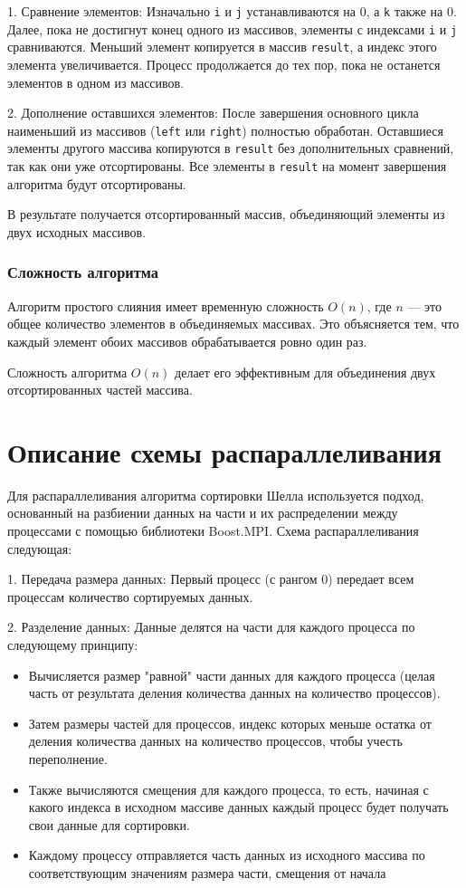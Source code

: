 \documentclass{report}
\begin{document}
1. Сравнение элементов: Изначально \texttt{i} и \texttt{j} устанавливаются на 0, а \texttt{k} также на 0. Далее, пока не достигнут конец одного из массивов, элементы с индексами \texttt{i} и \texttt{j} сравниваются. Меньший элемент копируется в массив \texttt{result}, а индекс этого элемента увеличивается. Процесс продолжается до тех пор, пока не останется элементов в одном из массивов.

2. Дополнение оставшихся элементов: После завершения основного цикла наименьший из массивов (\texttt{left} или \texttt{right}) полностью обработан. Оставшиеся элементы другого массива копируются в \texttt{result} без дополнительных сравнений, так как они уже отсортированы. Все элементы в \texttt{result} на момент завершения алгоритма будут отсортированы.

В результате получается отсортированный массив, объединяющий элементы из двух исходных массивов.

\subsubsection*{Сложность алгоритма}
Алгоритм простого слияния имеет временную сложность $O(n)$, где $n$ — это общее количество элементов в объединяемых массивах. Это объясняется тем, что каждый элемент обоих массивов обрабатывается ровно один раз. 

Сложность алгоритма $O(n)$ делает его эффективным для объединения двух отсортированных частей массива.

\newpage
\section*{Описание схемы распараллеливания}

Для распараллеливания алгоритма сортировки Шелла используется подход, основанный на разбиении данных на части и их распределении между процессами с помощью библиотеки Boost.MPI. Схема распараллеливания следующая:

1. Передача размера данных: Первый процесс (с рангом 0) передает всем процессам количество сортируемых данных.

2. Разделение данных: Данные делятся на части для каждого процесса по следующему принципу:
\begin{itemize}
     \item Вычисляется размер "равной" части данных для каждого процесса (целая часть от результата деления количества данных на количество процессов).
     \item Затем размеры частей для процессов, индекс которых меньше остатка от деления количества данных на количество процессов, чтобы учесть переполнение.
     \item Также вычисляются смещения для каждого процесса, то есть, начиная с какого индекса в исходном массиве данных каждый процесс будет получать свои данные для сортировки.
     \item Каждому процессу отправляется часть данных из исходного массива по соответствующим значениям размера части, смещения от начала
\end{itemize}
\end{document}
